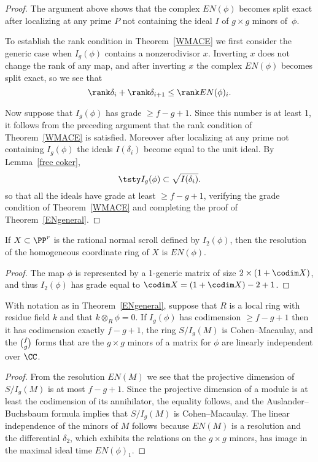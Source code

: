\begin{proof}
\hskip-3pt %
The argument above shows that the
complex $EN(\phi)$ becomes split exact after localizing at any prime $P$ not containing
the ideal $I$ of $g\times g$ minors of~$\phi$. 

\hskip-3pt %
To establish the rank condition in Theorem~\ref{WMACE} we first consider the
generic case when $I_{g}(\phi)$ contains a nonzerodivisor $x$. Inverting $x$
does not change the rank of any map, and after inverting $x$ the
complex $EN(\phi)$ becomes
split exact, so we see that 
$$
\rank \delta_{i}+\rank \delta_{i+1} \leq \rank EN(\phi)_{i}.
$$

Now suppose that $I_{g}(\phi)$ has grade $\geq f-g+1$. Since this number is
at least 1, it follows from the preceding argument that the rank condition
of Theorem~\ref{WMACE} is satisfied. Moreover after localizing at any prime
not containing $I_{g}(\phi)$ the ideals $I(\delta_{i})$ become equal to the unit ideal.
By Lemma~\ref{free coker},
 $$
\tsty %
I_{g}(\phi) \subset \sqrt{I(\delta_i)}.
$$
so that all the ideals have grade at least $\geq f-g+1$, verifying the grade condition
of Theorem~\ref{WMACE} and completing the proof of Theorem~\ref{ENgeneral}.
\end{proof}

\begin{corollary}\label{resolution of a scroll}
If $X\subset \PP^{r}$ is the rational normal scroll defined by $I_{2}(\phi)$, then the resolution of the homogeneous
coordinate ring of $X$ is $EN(\phi)$.
\unif
\end{corollary}

\begin{proof}
The map $\phi$ is represented by a 1-generic matrix of size $2\times (1+\codim X)$, and thus $I_{2}(\phi)$ has grade equal to $\codim X = (1+\codim X) - 2 +1$.
\end{proof}

\begin{corollary}\label{E-N cor}
With notation as in Theorem~\ref{ENgeneral}, suppose that $R$ is a local ring
with residue field $k$ and that
 $k\otimes_{R}\phi = 0$.
If $I_{g}(\phi)$
has codimension $\geq f-g+1$ then it has
codimension exactly $f-g+1$, the ring $S/I_g(M)$ is Cohen--Macaulay,
and the $\tbinom{f}{g}$ forms
that are the $g\times g$ minors of a matrix for $\phi$ are linearly
independent over $\CC$.
\unif
\end{corollary}

\begin{proof}
From the resolution $EN(M)$ we see that the projective dimension of
$S/I_g(M)$ is at most $f-g+1$. Since the projective dimension of a module
is at least the codimension of its annihilator, the equality follows,
and the Auslander--Buchsbaum formula implies that $S/I_g(M)$ is
%
%
Cohen--Macaulay. The linear independence of the minors of $M$ follows
because $EN(M)$ is a resolution and the differential $\delta_{2}$, which 
exhibits the relations on the $g\times g$ minors, has image in the
maximal ideal time $EN(\phi)_{1}$.
\end{proof}

